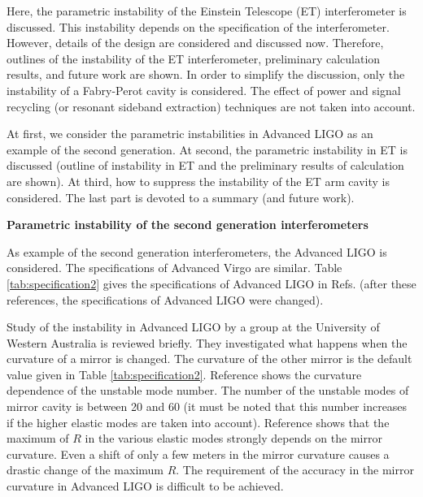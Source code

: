 Here, the parametric instability of the Einstein Telescope
(ET) interferometer is discussed. This instability depends on the
specification of the interferometer. However, details of
the design are considered and discussed now. Therefore, outlines of
the instability of the ET interferometer, preliminary calculation results, 
and future work are shown. In
order to simplify the discussion, only the instability of a
Fabry-Perot cavity is considered. The effect of power and signal
recycling (or resonant sideband extraction) techniques are not taken into
account.

At first, we consider the parametric instabilities in Advanced LIGO
as an example of the second generation.
At second, the parametric instability in ET is
discussed (outline of instability in ET and the preliminary results of calculation 
are shown). At third, how to suppress the instability of the ET
arm cavity is considered. The last part is devoted to a
summary (and future work).

\textbf{Parametric instability of the second generation interferometers}
\nopagebreak

As example of the second generation interferometers, the Advanced LIGO is considered. The specifications of 
Advanced Virgo are similar. Table \ref{tab:specification2} gives the specifications of Advanced
LIGO in Refs. \cite{Ju2006a,Ju2006b,Zhao2005} (after these references, the
specifications of Advanced LIGO were changed). 
  
Study of the instability in Advanced LIGO by a group at the
University of Western Australia \cite{Ju2006a,Ju2006b} is reviewed
briefly. They investigated what happens when the curvature of a
mirror is changed. The curvature of the other mirror is the
default value given in Table \ref{tab:specification2}. Reference
\cite{Ju2006b} shows the curvature dependence of the unstable mode
number. 
The number of the unstable modes of mirror cavity is between 20 and 60 
(it must be noted that this number increases if the higher elastic modes are taken into account). 
Reference \cite{Ju2006a} shows that the
maximum of $R$ in the various elastic modes strongly depends on
the mirror curvature. Even a shift of only a few meters in the
mirror curvature causes a drastic change of the maximum $R$. The
requirement of the accuracy in the mirror curvature in Advanced
LIGO is difficult to be achieved.

